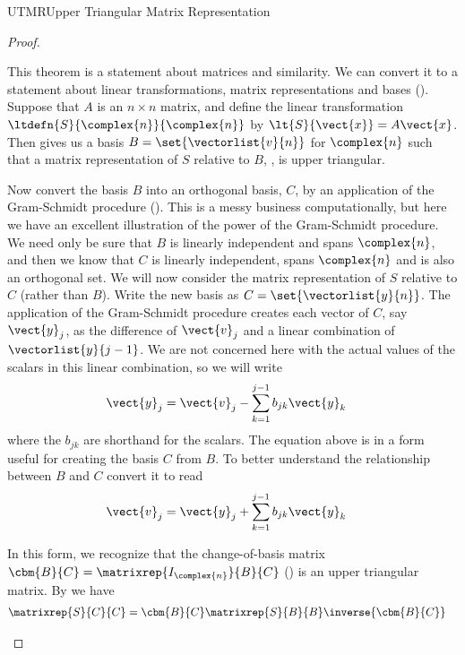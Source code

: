 \begin{subsect}{UTMR}{Upper Triangular Matrix Representation}
\begin{proof}
\begin{para}This theorem is a statement about matrices and similarity.  We can convert it to a statement about linear transformations, matrix representations and bases ().  Suppose that $A$ is an $n\times n$ matrix, and define the linear transformation $\ltdefn{S}{\complex{n}}{\complex{n}}$ by $\lt{S}{\vect{x}}=A\vect{x}$.  Then  gives us a basis $B=\set{\vectorlist{v}{n}}$ for $\complex{n}$ such that a matrix representation of $S$ relative to $B$, , is upper triangular.\end{para}
%
\begin{para}Now convert the basis $B$ into an orthogonal basis, $C$, by an application of the Gram-Schmidt procedure ().  This is a messy business computationally, but here we have an excellent illustration of the power of the Gram-Schmidt procedure.  We need only be sure that $B$ is linearly independent and spans $\complex{n}$, and then we know that $C$ is linearly independent, spans $\complex{n}$ and is also an orthogonal set.  We will now consider the matrix representation of $S$ relative to $C$ (rather than $B$).  Write the new basis as $C=\set{\vectorlist{y}{n}}$.  The application of the Gram-Schmidt procedure creates each vector of $C$, say $\vect{y}_j$, as the difference of $\vect{v}_j$ and a linear combination of $\vectorlist{y}{j-1}$.  We are not concerned here with the actual values of the scalars in this linear combination, so we will write
%
\begin{align*}
\vect{y}_j
&=\vect{v}_j-\sum_{k=1}^{j-1}b_{jk}\vect{y}_k
\end{align*}
%
where the $b_{jk}$ are shorthand for the scalars.  The equation above is in a form useful for creating the basis $C$ from $B$.  To better understand the relationship between $B$ and $C$ convert it to read
%
\begin{align*}
\vect{v}_j
&=\vect{y}_j+\sum_{k=1}^{j-1}b_{jk}\vect{y}_k
\end{align*}
\end{para}
%
\begin{para}In this form, we recognize that the change-of-basis matrix $\cbm{B}{C}=\matrixrep{I_{\complex{n}}}{B}{C}$ () is an upper triangular matrix.  By  we have
%
\begin{align*}
\matrixrep{S}{C}{C}&=\cbm{B}{C}\matrixrep{S}{B}{B}\inverse{\cbm{B}{C}}
\end{align*}

\end{para}
\end{proof}
\end{subsect}
